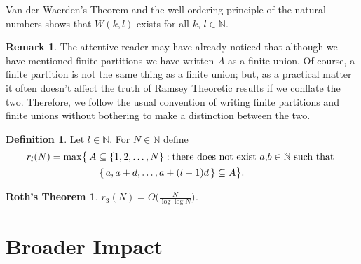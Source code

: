\documentclass[12pt]{article}
\theoremstyle{plain}
\newtheorem*{roth}{Roth's Theorem}
\theoremstyle{definition}
\newtheorem*{defn}{Definition}
\newtheorem*{rmk}{Remark}
\newcommand{\bbN}{\mathbb{N}}
\begin{document}
Van der Waerden's Theorem and the well-ordering principle of the
natural numbers shows that $W(k,l)$ exists for all $k$, $l \in \bbN$.

  \begin{rmk}
    The attentive reader may have already noticed that
    although we have mentioned finite partitions we have written $A$
    as a finite union.
    Of course, a finite partition is not the same thing as a finite
    union; but, as a practical matter it often doesn't affect the
    truth of Ramsey Theoretic results if we conflate the two. 
    Therefore, we follow the usual convention of writing finite
    partitions and finite unions without bothering to make a
    distinction between the two.
  \end{rmk}

  \begin{defn}
    Let $l \in \bbN$. 
    For $N \in \bbN$ define 
      \begin{align*}
        r_l(N) &= \max\bigr\{\, A \subseteq \{1, 2, \ldots, N\} : 
          \hbox{there does not exist $a$,$b \in \bbN$ such that } \\
          &\hspace{5em}\hbox{$\{\,a, a+d, \ldots, a+(l-1)d \,\}
            \subseteq A$} \bigl\}.
      \end{align*}
  \end{defn}

  \begin{roth}
    $r_3(N) = O\bigl(\frac{N}{\log\log N}\bigl)$.
  \end{roth}
\section{Broader Impact}



\end{document}
